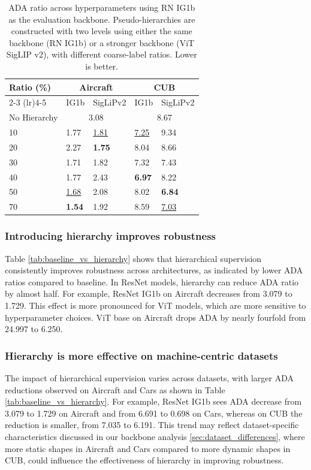 \documentclass[conference]{IEEEtran}
\begin{document}
\begin{table}[t]
\centering
\caption{ADA ratio across hyperparameters using RN IG1b as the evaluation backbone. Pseudo-hierarchies are constructed with two levels using either the same backbone (RN IG1b) or a stronger backbone (ViT SigLIP v2), with different coarse-label ratios. Lower is better.}
\label{tab:baseline_vs_pseudohierarchy}
\begin{tabularx}{\linewidth}{p{1.8615cm}XXXX}
\toprule
\multirow{2}{*}{Ratio (\%)} 
& \multicolumn{2}{c}{Aircraft} 
& \multicolumn{2}{c}{CUB} \\
\cmidrule(lr){2-3} \cmidrule(lr){4-5}
& IG1b
& SigLiPv2
& IG1b
& SigLiPv2 \\
\midrule
No Hierarchy 
& \multicolumn{2}{c}{3.08} 
& \multicolumn{2}{c}{8.67} \\
\midrule
10 & 1.77 & \underline{1.81} & \underline{7.25} & 9.34 \\
20 & 2.27 & \textbf{1.75} & 8.04 & 8.66 \\
30 & 1.71 & 1.82 & 7.32 & 7.43 \\
40 & 1.77 & 2.43 & \textbf{6.97} & 8.22 \\
50 & \underline{1.68} & 2.08 & 8.02 & \textbf{6.84} \\
70 & \textbf{1.54} & 1.92 & 8.59 & \underline{7.03} \\
\bottomrule
\end{tabularx}
\end{table}

\subsubsection{Introducing hierarchy improves robustness}
Table \ref{tab:baseline_vs_hierarchy} shows that hierarchical supervision consistently improves robustness across architectures, as indicated by lower ADA ratios compared to baseline. In ResNet models, hierarchy can reduce ADA ratio by almost half. For example, ResNet IG1b on Aircraft decreases from 3.079 to 1.729. This effect is more pronounced for ViT models, which are more sensitive to hyperparameter choices. ViT base on Aircraft drops ADA by nearly fourfold from 24.997 to 6.250.

\subsubsection{Hierarchy is more effective on machine-centric datasets}
The impact of hierarchical supervision varies across datasets, with larger ADA reductions observed on Aircraft and Cars as shown in Table \ref{tab:baseline_vs_hierarchy}. For example, ResNet IG1b sees ADA decrease from 3.079 to 1.729 on Aircraft and from 6.691 to 0.698 on Cars, whereas on CUB the reduction is smaller, from 7.035 to 6.191. This trend may reflect dataset-specific characteristics discussed in our backbone analysis \ref{sec:dataset_differences}, where more static shapes in Aircraft and Cars compared to more dynamic shapes in CUB, could influence the effectiveness of hierarchy in improving robustness.
\end{document}
